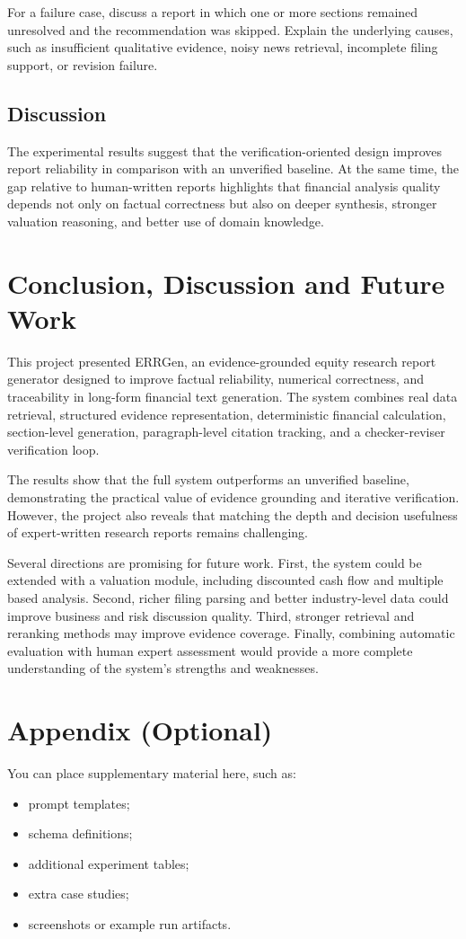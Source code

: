 \documentclass[11pt,a4paper]{article}
\begin{document}
For a failure case, discuss a report in which one or more sections remained
unresolved and the recommendation was skipped. Explain the underlying causes,
such as insufficient qualitative evidence, noisy news retrieval, incomplete
filing support, or revision failure.

\subsection{Discussion}
The experimental results suggest that the verification-oriented design improves
report reliability in comparison with an unverified baseline. At the same
time, the gap relative to human-written reports highlights that financial
analysis quality depends not only on factual correctness but also on deeper
synthesis, stronger valuation reasoning, and better use of domain knowledge.

\section{Conclusion, Discussion and Future Work}
This project presented ERRGen, an evidence-grounded equity research report
generator designed to improve factual reliability, numerical correctness, and
traceability in long-form financial text generation. The system combines real
data retrieval, structured evidence representation, deterministic financial
calculation, section-level generation, paragraph-level citation tracking, and a
checker-reviser verification loop.

The results show that the full system outperforms an unverified baseline,
demonstrating the practical value of evidence grounding and iterative
verification. However, the project also reveals that matching the depth and
decision usefulness of expert-written research reports remains challenging.

Several directions are promising for future work. First, the system could be
extended with a valuation module, including discounted cash flow and multiple
based analysis. Second, richer filing parsing and better industry-level data
could improve business and risk discussion quality. Third, stronger retrieval
and reranking methods may improve evidence coverage. Finally, combining
automatic evaluation with human expert assessment would provide a more complete
understanding of the system's strengths and weaknesses.

\newpage



\appendix
\section{Appendix (Optional)}
You can place supplementary material here, such as:
\begin{itemize}[leftmargin=1.5em]
    \item prompt templates;
    \item schema definitions;
    \item additional experiment tables;
    \item extra case studies;
    \item screenshots or example run artifacts.
\end{itemize}
\end{document}
